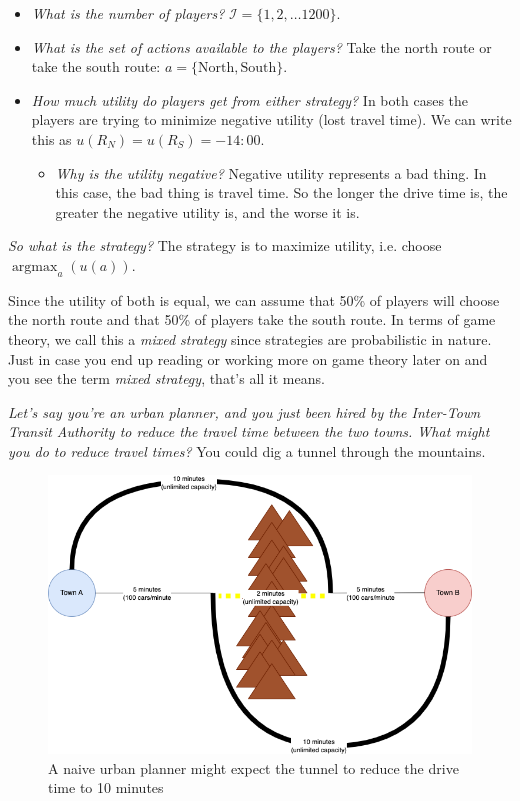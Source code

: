 \documentclass[11pt]{article}
\begin{document}
\begin{itemize}
    \item {\it What is the number of players?} $\mathcal{I} = \{1,2,\ldots 1200\}$.
    \item {\it What is the set of actions available to the players?} Take the north route or take the south route: $a = \{\text{North}, \text{South}\}$.
    \item {\it How much utility do players get from either strategy?} In both cases the players are trying to minimize negative utility (lost travel time). We can write this as $u(R_N) = u(R_S) = -14{:}00$.
    \begin{itemize}
        \item {\it Why is the utility negative?} Negative utility represents a bad thing. In this case, the bad thing is travel time. So the longer the drive time is, the greater the negative utility is, and the worse it is.
    \end{itemize}
\end{itemize}


{\it So what is the strategy?} The strategy is to maximize utility, i.e. choose $\operatorname*{argmax}_a (u(a))$.

Since the utility of both is equal, we can assume that 50\% of players will choose the north route and that 50\% of players take the south route. In terms of game theory, we call this a {\it mixed strategy} since strategies are probabilistic in nature. Just in case you end up reading or working more on game theory later on and you see the term {\it mixed strategy}, that's all it means.


{\it Let's say you're an urban planner, and you just been hired by the Inter-Town Transit Authority to reduce the travel time between the two towns. What might you do to reduce travel times?} You could dig a tunnel through the mountains.

\begin{figure}
    \centering
    \includegraphics[width=5in]{braess_2.png}
    \caption{A naive urban planner might expect the tunnel to reduce the drive time to 10 minutes}
\end{figure}
\end{document}
